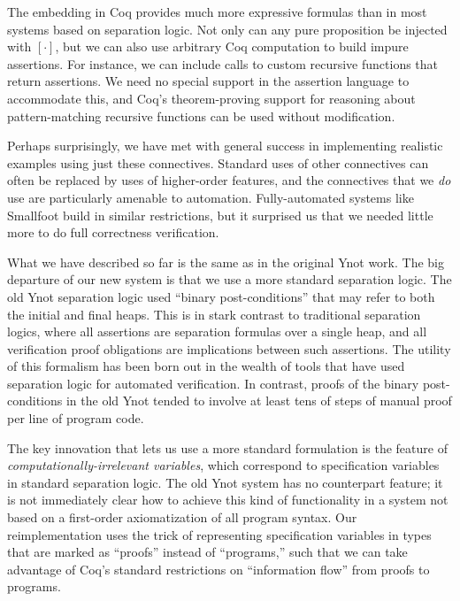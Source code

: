 \documentclass[preprint,nocopyrightspace]{sigplanconf}
\begin{document}
The embedding in Coq provides much more expressive formulas than in most systems based on separation logic.  Not only can any pure proposition be injected with $[\cdot]$, but we can also use arbitrary Coq computation to build impure assertions.  For instance, we can include calls to custom recursive functions that return assertions.  We need no special support in the assertion language to accommodate this, and Coq's theorem-proving support for reasoning about pattern-matching recursive functions can be used without modification.

Perhaps surprisingly, we have met with general success in implementing realistic examples using just these connectives.  Standard uses of other connectives can often be replaced by uses of higher-order features, and the connectives that we \emph{do} use are particularly amenable to automation.  Fully-automated systems like Smallfoot build in similar restrictions, but it surprised us that we needed little more to do full correctness verification.

\medskip

What we have described so far is the same as in the original Ynot
work.  The big departure of our new system is that we use a more
standard separation logic.  The old Ynot separation logic used
``binary post-conditions'' that may refer to both the initial and final
heaps.  This is in stark contrast to traditional separation logics,
where all assertions are separation formulas over a single heap, and
all verification proof obligations are implications between such
assertions.  The utility of this formalism has been born out in the
wealth of tools that have used separation logic for automated
verification.  In contrast, proofs of the binary post-conditions in the
old Ynot tended to involve at least tens of steps of manual proof per
line of program code.

The key innovation that lets us use a more standard formulation is the feature of \emph{computationally-irrelevant variables}, which correspond to specification variables in standard separation logic.  The old Ynot system has no counterpart feature; it is not immediately clear how to achieve this kind of functionality in a system not based on a first-order axiomatization of all program syntax.  Our reimplementation uses the trick of representing specification variables in types that are marked as ``proofs'' instead of ``programs,'' such that we can take advantage of Coq's standard restrictions on ``information flow'' from proofs to programs.
\end{document}
